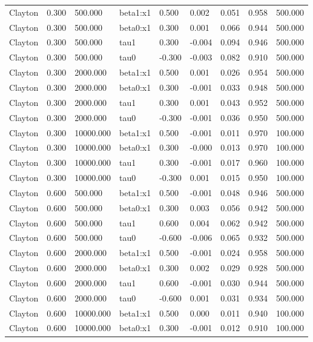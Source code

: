 \begin{table}[htbp]
\begin{tabular}{lllllllll}
Clayton & 0.300 & 500.000 & beta1:x1 & 0.500 & 0.002 & 0.051 & 0.958 & 500.000 \\
Clayton & 0.300 & 500.000 & beta0:x1 & 0.300 & 0.001 & 0.066 & 0.944 & 500.000 \\
Clayton & 0.300 & 500.000 & tau1 & 0.300 & -0.004 & 0.094 & 0.946 & 500.000 \\
Clayton & 0.300 & 500.000 & tau0 & -0.300 & -0.003 & 0.082 & 0.910 & 500.000 \\
Clayton & 0.300 & 2000.000 & beta1:x1 & 0.500 & 0.001 & 0.026 & 0.954 & 500.000 \\
Clayton & 0.300 & 2000.000 & beta0:x1 & 0.300 & -0.001 & 0.033 & 0.948 & 500.000 \\
Clayton & 0.300 & 2000.000 & tau1 & 0.300 & 0.001 & 0.043 & 0.952 & 500.000 \\
Clayton & 0.300 & 2000.000 & tau0 & -0.300 & -0.001 & 0.036 & 0.950 & 500.000 \\
Clayton & 0.300 & 10000.000 & beta1:x1 & 0.500 & -0.001 & 0.011 & 0.970 & 100.000 \\
Clayton & 0.300 & 10000.000 & beta0:x1 & 0.300 & -0.000 & 0.013 & 0.970 & 100.000 \\
Clayton & 0.300 & 10000.000 & tau1 & 0.300 & -0.001 & 0.017 & 0.960 & 100.000 \\
Clayton & 0.300 & 10000.000 & tau0 & -0.300 & 0.001 & 0.015 & 0.950 & 100.000 \\
Clayton & 0.600 & 500.000 & beta1:x1 & 0.500 & -0.001 & 0.048 & 0.946 & 500.000 \\
Clayton & 0.600 & 500.000 & beta0:x1 & 0.300 & 0.003 & 0.056 & 0.942 & 500.000 \\
Clayton & 0.600 & 500.000 & tau1 & 0.600 & 0.004 & 0.062 & 0.942 & 500.000 \\
Clayton & 0.600 & 500.000 & tau0 & -0.600 & -0.006 & 0.065 & 0.932 & 500.000 \\
Clayton & 0.600 & 2000.000 & beta1:x1 & 0.500 & -0.001 & 0.024 & 0.958 & 500.000 \\
Clayton & 0.600 & 2000.000 & beta0:x1 & 0.300 & 0.002 & 0.029 & 0.928 & 500.000 \\
Clayton & 0.600 & 2000.000 & tau1 & 0.600 & -0.001 & 0.030 & 0.944 & 500.000 \\
Clayton & 0.600 & 2000.000 & tau0 & -0.600 & 0.001 & 0.031 & 0.934 & 500.000 \\
Clayton & 0.600 & 10000.000 & beta1:x1 & 0.500 & 0.000 & 0.011 & 0.940 & 100.000 \\
Clayton & 0.600 & 10000.000 & beta0:x1 & 0.300 & -0.001 & 0.012 & 0.910 & 100.000 \\

\end{tabular}
\end{table}
